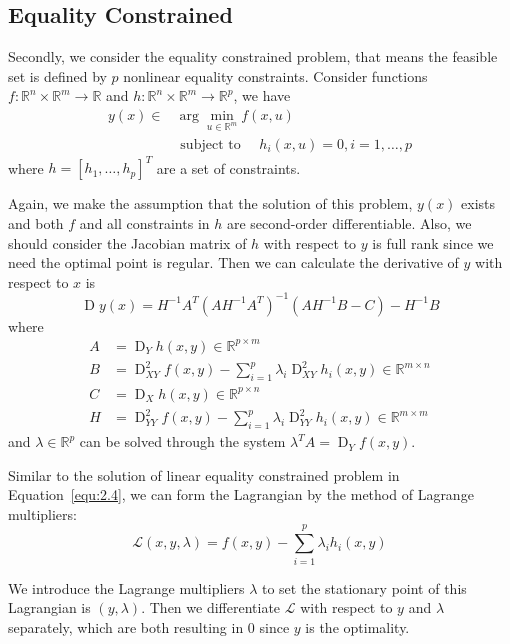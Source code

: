 \subsection{Equality Constrained}
Secondly, we consider the equality constrained problem, that means the feasible set is defined by $p$ nonlinear equality constraints. Consider functions $f: \mathbb{R}^n \times \mathbb{R}^m \rightarrow \mathbb{R}$ and $h: \mathbb{R}^n \times \mathbb{R}^m \rightarrow \mathbb{R}^p$, we have
\begin{equation}
    \begin{aligned} 
        y(x) \in & \arg \min _{u \in \mathbb{R}^{m}} f(x, u) \\ & \text { subject to } \quad h_{i}(x, u)=0, i=1, \ldots, p 
    \end{aligned}
\end{equation}
where $h = [h_1, \dots, h_p]^T$ are a set of constraints. 
\par Again, we make the assumption that the solution of this problem, $y(x)$ exists and both $f$ and all constraints in $h$ are second-order differentiable. Also, we should consider the Jacobian matrix of $h$ with respect to $y$ is full rank since we need the optimal point is regular. Then we can calculate the derivative of $y$ with respect to $x$ is
$$
\operatorname{D} y(x)=H^{-1} A^{T}\left(A H^{-1} A^{T}\right)^{-1}\left(A H^{-1} B-C\right)-H^{-1} B
$$
where
$$
\begin{aligned} 
    A &=\operatorname{D}_{Y} h(x, y) \in \mathbb{R}^{p \times m} \\ B &=\operatorname{D}_{X Y}^{2} f(x, y)-\sum_{i=1}^{p} \lambda_{i} \operatorname{D}_{X Y}^{2} h_{i}(x, y) \in \mathbb{R}^{m \times n} \\ C &=\operatorname{D}_{X} h(x, y) \in \mathbb{R}^{p \times n} \\ H &=\operatorname{D}_{Y Y}^{2} f(x, y)-\sum_{i=1}^{p} \lambda_{i} \operatorname{D}_{Y Y}^{2} h_{i}(x, y) \in \mathbb{R}^{m \times m} 
\end{aligned}
$$
and $\lambda \in \mathbb{R}^p$ can be solved through the system $\lambda ^T A = \operatorname{D}_Yf(x,y)$. 
\par Similar to the solution of linear equality constrained problem in Equation~\ref{equ:2.4}, we can form the Lagrangian by the method of Lagrange multipliers\citep{BD:14}:
\begin{equation}
    \mathcal{L}(x, y, \lambda)=f(x, y)-\sum_{i=1}^{p} \lambda_{i} h_{i}(x, y)
\end{equation}
\par We introduce the Lagrange multipliers $\lambda$ to set the stationary point of this Lagrangian is $(y, \lambda)$. Then we differentiate $\mathcal{L}$ with respect to $y$ and $\lambda$ separately, which are both resulting in 0 since $y$ is the optimality. 

